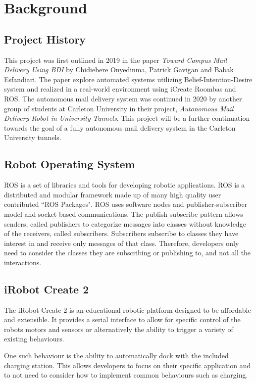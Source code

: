 \documentclass[12pt]{report}
\begin{document}
\chapter{Background}
\section{Project History}
This project was first outlined in 2019 in the paper \textit{Toward Campus Mail Delivery Using BDI}\cite{PatrickPaper} by Chidiebere Onyedinma, Patrick Gavigan and  Babak Esfandiari. The paper explore automated systems utilizing Belief-Intention-Desire system and realized in a real-world environment using iCreate Roombas and ROS. The autonomous mail delivery system was continued in  2020 by another group of students at Carleton University in their project, \textit{Autonomous Mail Delivery Robot in University Tunnels}. This project will be a further continuation towards the goal of a fully autonomous mail delivery system in the Carleton University tunnels.
\section{Robot Operating System}
ROS is a set of libraries and tools for developing robotic applications. ROS is a distributed and modular framework made up of many high quality user contributed ``ROS Packages". ROS uses software nodes and publisher-subscriber model and socket-based communications. The publish-subscribe pattern allows senders, called publishers to categorize messages into classes without knowledge of the receivers, called subscribers. Subscribers subscribe to classes they have interest in and receive only messages of that class. Therefore, developers only need to consider the classes they are subscribing or publishing to, and not all the interactions.
\section{iRobot Create 2}
The iRobot Create 2 is an educational robotic platform designed to be affordable and extensible. It provides a serial interface to allow for specific control of the robots motors and sensors or alternatively the ability to trigger a variety of existing behaviours. 

One such behaviour is the ability to automatically dock with the included charging station. This allows developers to focus on  their specific application and to not need to consider how to implement common behaviours such as charging.
\end{document}
